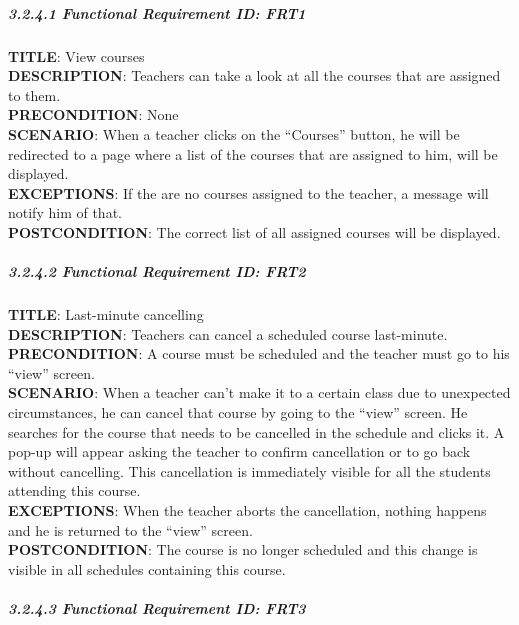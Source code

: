 \documentclass[12pt]{article}
\begin{document}
\subparagraph{3.2.4.1 Functional Requirement \textbf{ID}:
FRT1\\}\label{functional-requirement-id-frt1}

\textbf{TITLE}: View courses\\\textbf{DESCRIPTION}: Teachers can take a
look at all the courses that are assigned to
them.\\\textbf{PRECONDITION}: None\\\textbf{SCENARIO}: When a teacher
clicks on the ``Courses'' button, he will be redirected to a page where
a list of the courses that are assigned to him, will be
displayed.\\\textbf{EXCEPTIONS}: If the are no courses assigned to the
teacher, a message will notify him of that.\\\textbf{POSTCONDITION}: The
correct list of all assigned courses will be displayed.

\subparagraph{3.2.4.2 Functional Requirement \textbf{ID}:
FRT2\\}\label{functional-requirement-id-frt2}

\textbf{TITLE}: Last-minute cancelling\\\textbf{DESCRIPTION}: Teachers
can cancel a scheduled course last-minute.\\\textbf{PRECONDITION}: A
course must be scheduled and the teacher must go to his ``view''
screen.\\\textbf{SCENARIO}: When a teacher can't make it to a certain
class due to unexpected circumstances, he can cancel that course by
going to the ``view'' screen. He searches for the course that needs to
be cancelled in the schedule and clicks it. A pop-up will appear asking
the teacher to confirm cancellation or to go back without cancelling.
This cancellation is immediately visible for all the students attending
this course.\\\textbf{EXCEPTIONS}: When the teacher aborts the
cancellation, nothing happens and he is returned to the ``view''
screen.\\\textbf{POSTCONDITION}: The course is no longer scheduled and
this change is visible in all schedules containing this course.

\subparagraph{3.2.4.3 Functional Requirement \textbf{ID}:
FRT3\\}\label{functional-requirement-id-frt3}
\end{document}

